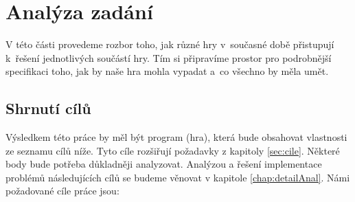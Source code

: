 
\chapter{Analýza zadání}
\label{chap:analyza}

V této části provedeme rozbor toho, jak různé hry v~současné době přistupují k~řešení jednotlivých součástí hry. Tím si připravíme prostor pro podrobnější specifikaci toho, jak by naše hra mohla vypadat a~co všechno by měla umět.








\section{Shrnutí cílů}

Výsledkem této práce by měl být program (hra), která bude obsahovat vlastnosti ze seznamu cílů níže. Tyto cíle rozšiřují požadavky z kapitoly \ref{sec:cile}. Některé body bude potřeba důkladněji analyzovat. Analýzou a řešení implementace problémů následujících cílů se budeme věnovat v kapitole \ref{chap:detailAnal}. Námi požadované cíle práce jsou:

